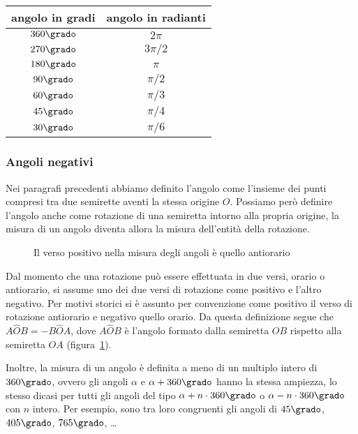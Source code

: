 \begin{center}
\begin{tabular}{cc}
\toprule
angolo in gradi	& angolo in radianti\\
\midrule
\(360\grado\) & \(2\pi\)\\
\(270\grado\) & \(3\pi/2\)\\
\(180\grado\) & \(\pi\)\\
\(90\grado\) & \(\pi/2\)\\
\(60\grado\) & \(\pi/3\)\\
\(45\grado\) & \(\pi/4\)\\
\(30\grado\) & \(\pi/6\)\\
\bottomrule
\end{tabular}
\end{center}

\subsubsection{Angoli negativi}

Nei paragrafi precedenti abbiamo definito l'angolo come l'insieme dei 
punti compresi tra due semirette aventi la stessa origine \(O\). 
Possiamo però definire l'angolo anche come rotazione di una semiretta 
intorno alla propria origine, la misura di un angolo diventa allora 
la misura dell'entità della rotazione.


\begin{inaccessibleblock}
 \begin{figure}[!htb]
	\centering
	\caption{Il verso positivo nella misura degli angoli è quello 
antiorario}\label{fig:1.43}
\end{figure}
\end{inaccessibleblock}

Dal momento che una rotazione può essere effettuata in due versi, 
orario o antiorario, si assume uno dei due versi di rotazione come 
positivo e l'altro negativo. Per motivi storici si è assunto per 
convenzione come positivo il verso di rotazione antiorario e negativo 
quello orario.
Da questa definizione segue che \(A\widehat{O}B = -B\widehat{O}A\), 
dove \(A\widehat{O}B\) è l'angolo formato dalla semiretta \(OB\) rispetto 
alla semiretta \(OA\) (figura~\ref{fig:1.43}).

Inoltre, la misura di un angolo è definita a meno di un multiplo 
intero di \(360\grado\), ovvero gli angoli \(\alpha\) e 
\(\alpha+360\grado\) hanno la stessa ampiezza, lo stesso dicasi per 
tutti gli angoli del tipo \(\alpha+n\cdot 360\grado\) o \(\alpha - 
n\cdot 360\grado\) con \(n\) intero. Per esempio, sono tra loro 
congruenti gli angoli di \(45\grado\), \(405\grado\), \(765\grado\), 
\ldots{}

